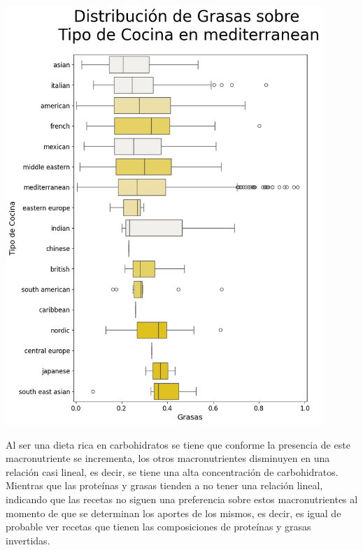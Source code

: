 \documentclass[12pt,a4paper]{article}
\begin{document}
            \begin{center}
                \includegraphics[width=0.90\textwidth]{Resources/2_03_plot_03_3.png}
            \end{center}

            Al ser una dieta rica en carbohidratos se tiene que conforme la presencia de 
            este macronutriente se incrementa, los otros macronutrientes disminuyen en 
            una relación casi lineal, es decir, se tiene una alta concentración de carbohidratos. 
            Mientras que las proteínas y grasas tienden a no tener una relación lineal, indicando 
            que las recetas no siguen una preferencia sobre estos macronutrientes al momento de 
            que se determinan los aportes de los mismos, es decir, es igual de probable ver 
            recetas que tienen las composiciones de proteínas y grasas invertidas.
\end{document}
